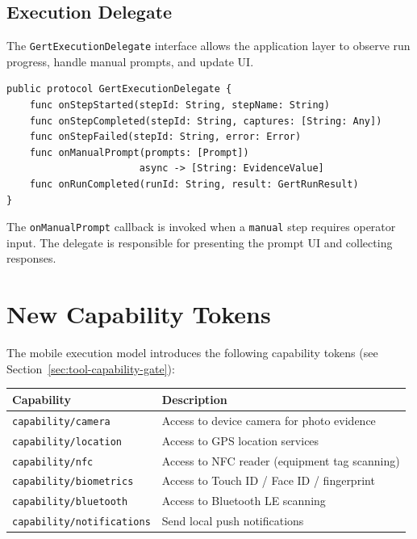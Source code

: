 \subsection{Execution Delegate}

The \texttt{GertExecutionDelegate} interface allows the application layer to observe run progress, handle manual prompts, and update UI.

\begin{verbatim}
public protocol GertExecutionDelegate {
    func onStepStarted(stepId: String, stepName: String)
    func onStepCompleted(stepId: String, captures: [String: Any])
    func onStepFailed(stepId: String, error: Error)
    func onManualPrompt(prompts: [Prompt]) 
                       async -> [String: EvidenceValue]
    func onRunCompleted(runId: String, result: GertRunResult)
}
\end{verbatim}

The \texttt{onManualPrompt} callback is invoked when a \texttt{manual} step requires operator input. The delegate is responsible for presenting the prompt UI and collecting responses.

\section{New Capability Tokens}

The mobile execution model introduces the following capability tokens (see Section~\ref{sec:tool-capability-gate}):

\begin{center}
\begin{tabular}{ll}
\hline
\textbf{Capability} & \textbf{Description} \\
\hline
\texttt{capability/camera} & Access to device camera for photo evidence \\
\texttt{capability/location} & Access to GPS location services \\
\texttt{capability/nfc} & Access to NFC reader (equipment tag scanning) \\
\texttt{capability/biometrics} & Access to Touch ID / Face ID / fingerprint \\
\texttt{capability/bluetooth} & Access to Bluetooth LE scanning \\
\texttt{capability/notifications} & Send local push notifications \\
\hline
\end{tabular}
\end{center}

